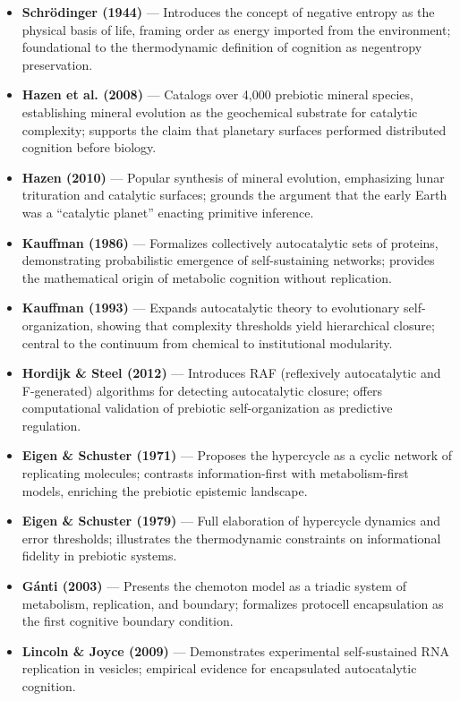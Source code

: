 \documentclass[11pt,a4paper]{article}
\begin{document}
\begin{itemize}
    \item \textbf{Schrödinger (1944)} — Introduces the concept of negative entropy as the physical basis of life, framing order as energy imported from the environment; foundational to the thermodynamic definition of cognition as negentropy preservation.
    \item \textbf{Hazen et al. (2008)} — Catalogs over 4,000 prebiotic mineral species, establishing mineral evolution as the geochemical substrate for catalytic complexity; supports the claim that planetary surfaces performed distributed cognition before biology.
    \item \textbf{Hazen (2010)} — Popular synthesis of mineral evolution, emphasizing lunar trituration and catalytic surfaces; grounds the argument that the early Earth was a “catalytic planet” enacting primitive inference.
    \item \textbf{Kauffman (1986)} — Formalizes collectively autocatalytic sets of proteins, demonstrating probabilistic emergence of self-sustaining networks; provides the mathematical origin of metabolic cognition without replication.
    \item \textbf{Kauffman (1993)} — Expands autocatalytic theory to evolutionary self-organization, showing that complexity thresholds yield hierarchical closure; central to the continuum from chemical to institutional modularity.
    \item \textbf{Hordijk \& Steel (2012)} — Introduces RAF (reflexively autocatalytic and F-generated) algorithms for detecting autocatalytic closure; offers computational validation of prebiotic self-organization as predictive regulation.
    \item \textbf{Eigen \& Schuster (1971)} — Proposes the hypercycle as a cyclic network of replicating molecules; contrasts information-first with metabolism-first models, enriching the prebiotic epistemic landscape.
    \item \textbf{Eigen \& Schuster (1979)} — Full elaboration of hypercycle dynamics and error thresholds; illustrates the thermodynamic constraints on informational fidelity in prebiotic systems.
    \item \textbf{Gánti (2003)} — Presents the chemoton model as a triadic system of metabolism, replication, and boundary; formalizes protocell encapsulation as the first cognitive boundary condition.
    \item \textbf{Lincoln \& Joyce (2009)} — Demonstrates experimental self-sustained RNA replication in vesicles; empirical evidence for encapsulated autocatalytic cognition.
\end{itemize}
\end{document}
